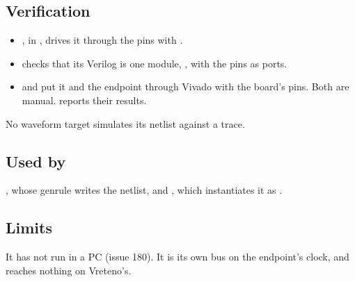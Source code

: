 \subsection*{Verification}

\begin{itemize}
\item {}, in
, drives it through the pins with
.
\item {} checks that its
Verilog is one module, , with the pins as ports.
\item {} and 
put it and the endpoint through Vivado with the board's pins. Both are
manual.  reports their results.
\end{itemize}

No waveform target simulates its netlist against a trace.

\subsection*{Used by}

, whose genrule  writes
the netlist, and , which instantiates it as
.

\subsection*{Limits}

It has not run in a PC (issue 180). It is its own bus on the endpoint's
clock, and reaches nothing on Vreteno's.
